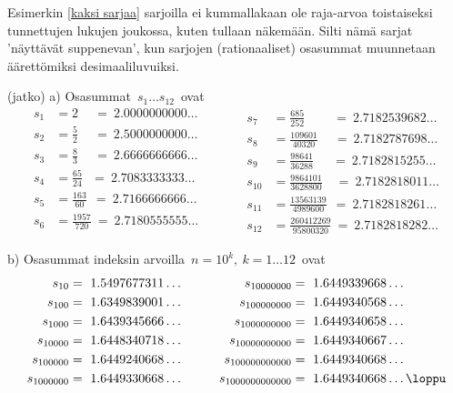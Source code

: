 Esimerkin \ref{kaksi sarjaa} sarjoilla ei kummallakaan ole raja-arvoa toistaiseksi 
tunnettujen lukujen joukossa, kuten tullaan näkemään. Silti nämä sarjat 
'näyttävät suppenevan', kun sarjojen (rationaaliset) osasummat muunnetaan äärettömiksi 
desimaaliluvuiksi. 
\jatko \begin{Exa} (jatko) a) Osasummat $\,s_1 \ldots s_{12}\,$ ovat
\[
\begin{aligned}
s_1         &= 2 \quad\               =\ 2.0000000000 \ldots \\
s_2         &= \tfrac{5}{2} \quad\    =\ 2.5000000000 \ldots \\
s_3         &= \tfrac{8}{3} \quad\    =\ 2.6666666666 \ldots \\
s_4         &= \tfrac{65}{24} \ \ \   =\ 2.7083333333 \ldots \\
s_5         &= \tfrac{163}{60} \ \    =\ 2.7166666666 \ldots \\
s_6         &= \tfrac{1957}{720} \    =\ 2.7180555555 \ldots \\
\end{aligned} \qquad\quad
\begin{aligned}
s_7\        &= \tfrac{685}{252} \qquad\        =\ 2.7182539682 \ldots \\
s_8\        &= \tfrac{109601}{40320} \quad\    =\ 2.7182787698 \ldots \\
s_9\        &= \tfrac{98641}{36288} \quad\ \   =\ 2.7182815255 \ldots \\
s_{10}      &= \tfrac{9864101}{3628800} \quad  =\ 2.7182818011 \ldots \\
s_{11}      &= \tfrac{13563139}{4989600} \ \   =\ 2.7182818261 \ldots \\
s_{12}      &= \tfrac{260412269}{95800320}\    =\ 2.7182818282 \ldots
\end{aligned}
\]

b) Osasummat indeksin arvoilla $\,n=10^k,\ k=1 \ldots 12\,$ ovat
\[
\begin{aligned}
s_{10}       &=\ 1.5497677311 \ldots \\
s_{100}      &=\ 1.6349839001 \ldots \\
s_{1000}     &=\ 1.6439345666 \ldots \\
s_{10000}    &=\ 1.6448340718 \ldots \\
s_{100000}   &=\ 1.6449240668 \ldots \\
s_{1000000}  &=\ 1.6449330668 \ldots
\end{aligned} \qquad\quad
\begin{aligned}
s_{10000000}      &=\ 1.6449339668 \ldots \\
s_{100000000}     &=\ 1.6449340568 \ldots \\
s_{1000000000}    &=\ 1.6449340658 \ldots \\
s_{10000000000}   &=\ 1.6449340667 \ldots \\
s_{100000000000}  &=\ 1.6449340668 \ldots \\
s_{1000000000000} &=\ 1.6449340668 \ldots \loppu
\end{aligned}
\]
\end{Exa}

